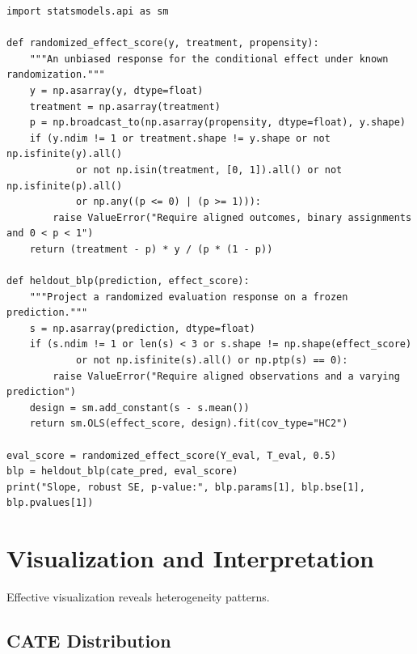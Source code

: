 \begin{verbatim}
import statsmodels.api as sm

def randomized_effect_score(y, treatment, propensity):
    """An unbiased response for the conditional effect under known randomization."""
    y = np.asarray(y, dtype=float)
    treatment = np.asarray(treatment)
    p = np.broadcast_to(np.asarray(propensity, dtype=float), y.shape)
    if (y.ndim != 1 or treatment.shape != y.shape or not np.isfinite(y).all()
            or not np.isin(treatment, [0, 1]).all() or not np.isfinite(p).all()
            or np.any((p <= 0) | (p >= 1))):
        raise ValueError("Require aligned outcomes, binary assignments and 0 < p < 1")
    return (treatment - p) * y / (p * (1 - p))

def heldout_blp(prediction, effect_score):
    """Project a randomized evaluation response on a frozen prediction."""
    s = np.asarray(prediction, dtype=float)
    if (s.ndim != 1 or len(s) < 3 or s.shape != np.shape(effect_score)
            or not np.isfinite(s).all() or np.ptp(s) == 0):
        raise ValueError("Require aligned observations and a varying prediction")
    design = sm.add_constant(s - s.mean())
    return sm.OLS(effect_score, design).fit(cov_type="HC2")

eval_score = randomized_effect_score(Y_eval, T_eval, 0.5)
blp = heldout_blp(cate_pred, eval_score)
print("Slope, robust SE, p-value:", blp.params[1], blp.bse[1], blp.pvalues[1])
\end{verbatim}


\section{Visualization and Interpretation}\label{sec:ch09_visualization}

Effective visualization reveals heterogeneity patterns.

\subsection{CATE Distribution}

